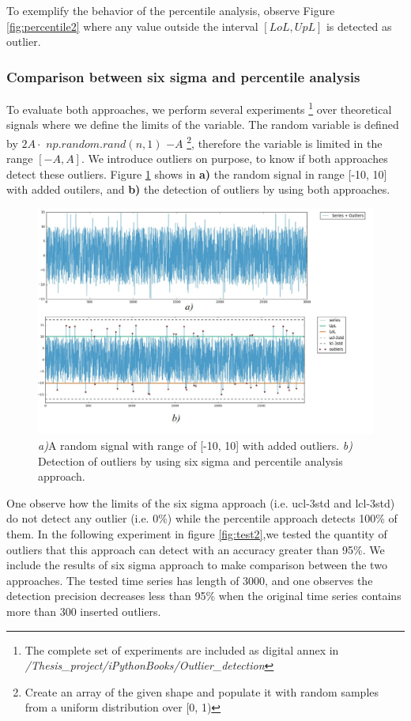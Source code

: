 To exemplify the behavior of the percentile analysis, observe Figure \ref{fig:percentile2} where any value outside the interval $[LoL, UpL]$ is detected as outlier. 

\subsubsection{Comparison between six sigma and percentile analysis}
To evaluate both approaches, we perform several experiments \footnote{The complete set of experiments are included as digital annex in \textit{/Thesis\_project/iPythonBooks/Outlier\_detection}} over theoretical signals where we define the limits of the variable. The random variable is defined by $2A \cdot$ $np.random.rand(n,1)$ $- A$ \footnote{Create an array of the given shape and populate it with random samples from a uniform distribution over [0, 1)}, therefore the variable is limited in the range $[-A, A]$. We introduce outliers on purpose, to know if both approaches detect these outliers. Figure \ref{fig:comparison} shows in \textbf{a)} the random signal in range [-10, 10] with added outilers, and \textbf{b)} the detection of outliers by using both approaches.    


\begin{figure}[h!]
  \vspace{0.5em} %
  \includegraphics[scale=0.5]{Figures/test.jpg}
  \caption{\textit{a)}A random signal with range of [-10, 10] with added outliers.  \textit{b)} Detection of outliers by using six sigma and percentile analysis approach.}  
  \label{fig:comparison}
\end{figure}

One observe how the limits of the six sigma approach (i.e. ucl-3std and lcl-3std) do not detect any outlier (i.e. $0\%$) while the percentile approach detects 100\% of them. In the following experiment in figure \ref{fig:test2},we tested the quantity of outliers that this approach can detect with an accuracy greater than 95\%. We include the results of six sigma approach to make comparison between the two approaches. The tested time series has length of 3000, and one observes the detection precision  decreases less than 95\% when the original time series contains more than 300 inserted outliers.

